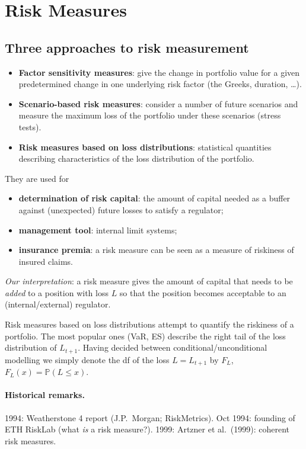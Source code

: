 \documentclass[11pt,a4paper]{article}
\renewcommand{\P}{\mathbb{P}}
\begin{document}
\section{Risk Measures}

\subsection{Three approaches to risk measurement}
\begin{itemize}[nosep]
  \item \textbf{Factor sensitivity measures}: give the change in portfolio value for a given
        predetermined change in one underlying risk factor (the Greeks, duration, \dots).
  \item \textbf{Scenario-based risk measures}: consider a number of future scenarios and measure the
        maximum loss of the portfolio under these scenarios (stress tests).
  \item \textbf{Risk measures based on loss distributions}: statistical quantities describing
        characteristics of the loss distribution of the portfolio.
\end{itemize}
They are used for
\begin{itemize}[nosep]
  \item \textbf{determination of risk capital}: the amount of capital needed as a buffer against
        (unexpected) future losses to satisfy a regulator;
  \item \textbf{management tool}: internal limit systems;
  \item \textbf{insurance premia}: a risk measure can be seen as a measure of riskiness of insured
        claims.
\end{itemize}
\emph{Our interpretation}: a risk measure gives the amount of capital that needs to be \emph{added}
to a position with loss $L$ so that the position becomes acceptable to an (internal/external)
regulator.

Risk measures based on loss distributions attempt to quantify the riskiness of a portfolio. The most
popular ones (VaR, ES) describe the right tail of the loss distribution of $L_{t+1}$. Having decided
between conditional/unconditional modelling we simply denote the df of the loss $L=L_{t+1}$ by $F_L$,
$F_L(x)=\P(L\le x)$.

\paragraph{Historical remarks.} 1994: Weatherstone 4 report (J.P.\ Morgan; RiskMetrics).
Oct 1994: founding of ETH RiskLab (what \emph{is} a risk measure?). 1999: Artzner et al.\ (1999):
coherent risk measures.
\end{document}
